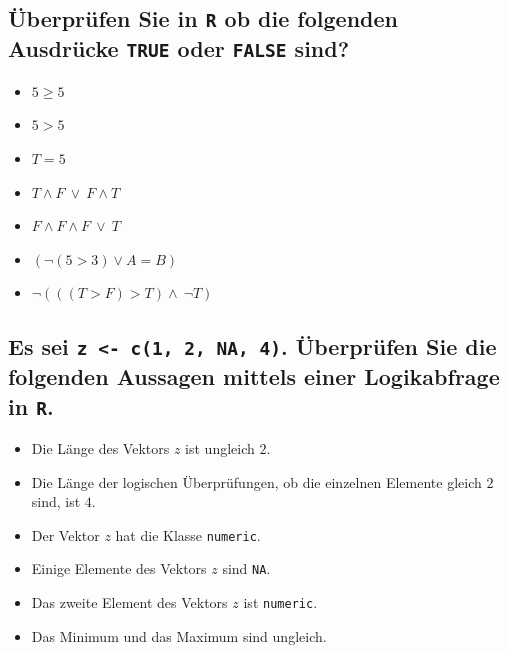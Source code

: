 \documentclass[12pt,a4paper]{article}
\begin{document}
\hypertarget{uxfcberpruxfcfen-sie-in-r-ob-die-folgenden-ausdruxfccke-true-oder-false-sind}{%
\subsection{\texorpdfstring{Überprüfen Sie in \texttt{R} ob die
folgenden Ausdrücke \texttt{TRUE} oder \texttt{FALSE}
sind?}{Überprüfen Sie in R ob die folgenden Ausdrücke TRUE oder FALSE sind?}}\label{uxfcberpruxfcfen-sie-in-r-ob-die-folgenden-ausdruxfccke-true-oder-false-sind}}

\begin{itemize}
  \item $5 \geq 5$
  \item $5 > 5$
  \item $T = 5$
  \item $T \land F \ \lor \ F \land T$
  \item $F \land F \land F\ \lor \ T$
  \item $(\neg (5 > 3) \lor A = B)$
  \item $\neg(((T > F) > T) \land \ \neg T)$
\end{itemize}

\hypertarget{es-sei-z---c1-2-na-4.-uxfcberpruxfcfen-sie-die-folgenden-aussagen-mittels-einer-logikabfrage-in-r.}{%
\subsection{\texorpdfstring{Es sei
\texttt{z\ \textless{}-\ c(1,\ 2,\ NA,\ 4)}. Überprüfen Sie die
folgenden Aussagen mittels einer Logikabfrage in
\texttt{R}.}{Es sei z \textless- c(1, 2, NA, 4). Überprüfen Sie die folgenden Aussagen mittels einer Logikabfrage in R.}}\label{es-sei-z---c1-2-na-4.-uxfcberpruxfcfen-sie-die-folgenden-aussagen-mittels-einer-logikabfrage-in-r.}}

\begin{itemize}
  \item Die Länge des Vektors $z$ ist ungleich $2$.
  \item Die Länge der logischen Überprüfungen, ob die einzelnen Elemente gleich $2$ sind, ist $4$.
  \item Der Vektor $z$ hat die Klasse \texttt{numeric}.
  \item Einige Elemente des Vektors $z$ sind \texttt{NA}. 
  \item Das zweite Element des Vektors $z$ ist \texttt{numeric}.
  \item Das Minimum und das Maximum sind ungleich. 
\end{itemize}
\end{document}
